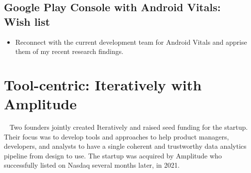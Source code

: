 \subsection*{Google Play Console with Android Vitals: Wish list}
{\small
\begin{itemize}
    \item Reconnect with the current development team for Android Vitals and apprise them of my recent research findings.
\end{itemize}
}

\clearpage


\section{Tool-centric: Iteratively with Amplitude}~\label{case-study-overview-iteratively-with-amplitude}
Two founders jointly created Iteratively and raised seed funding for the startup. Their focus was to develop tools and approaches to help product managers, developers, and analysts to have a single coherent and trustworthy data analytics pipeline from design to use. The startup was acquired by Amplitude who successfully listed on Nasdaq several months later, in 2021. 


